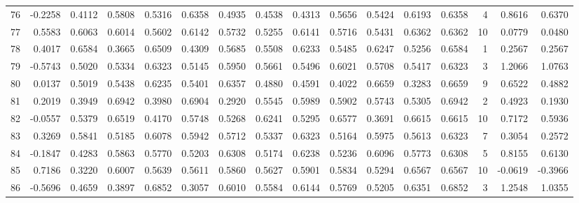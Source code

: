 \begin{tabular}{lrrrrrrrrrrrrrrr}
76  &     -0.2258 &  0.4112 &  0.5808 &  0.5316 &  0.6358 &  0.4935 &  0.4538 &  0.4313 &  0.5656 &  0.5424 &   0.6193 &     0.6358 &      4 &                    0.8616 &                     0.6370 \\
77  &      0.5583 &  0.6063 &  0.6014 &  0.5602 &  0.6142 &  0.5732 &  0.5255 &  0.6141 &  0.5716 &  0.5431 &   0.6362 &     0.6362 &     10 &                    0.0779 &                     0.0480 \\
78  &      0.4017 &  0.6584 &  0.3665 &  0.6509 &  0.4309 &  0.5685 &  0.5508 &  0.6233 &  0.5485 &  0.6247 &   0.5256 &     0.6584 &      1 &                    0.2567 &                     0.2567 \\
79  &     -0.5743 &  0.5020 &  0.5334 &  0.6323 &  0.5145 &  0.5950 &  0.5661 &  0.5496 &  0.6021 &  0.5708 &   0.5417 &     0.6323 &      3 &                    1.2066 &                     1.0763 \\
80  &      0.0137 &  0.5019 &  0.5438 &  0.6235 &  0.5401 &  0.6357 &  0.4880 &  0.4591 &  0.4022 &  0.6659 &   0.3283 &     0.6659 &      9 &                    0.6522 &                     0.4882 \\
81  &      0.2019 &  0.3949 &  0.6942 &  0.3980 &  0.6904 &  0.2920 &  0.5545 &  0.5989 &  0.5902 &  0.5743 &   0.5305 &     0.6942 &      2 &                    0.4923 &                     0.1930 \\
82  &     -0.0557 &  0.5379 &  0.6519 &  0.4170 &  0.5748 &  0.5268 &  0.6241 &  0.5295 &  0.6577 &  0.3691 &   0.6615 &     0.6615 &     10 &                    0.7172 &                     0.5936 \\
83  &      0.3269 &  0.5841 &  0.5185 &  0.6078 &  0.5942 &  0.5712 &  0.5337 &  0.6323 &  0.5164 &  0.5975 &   0.5613 &     0.6323 &      7 &                    0.3054 &                     0.2572 \\
84  &     -0.1847 &  0.4283 &  0.5863 &  0.5770 &  0.5203 &  0.6308 &  0.5174 &  0.6238 &  0.5236 &  0.6096 &   0.5773 &     0.6308 &      5 &                    0.8155 &                     0.6130 \\
85  &      0.7186 &  0.3220 &  0.6007 &  0.5639 &  0.5611 &  0.5860 &  0.5627 &  0.5901 &  0.5834 &  0.5294 &   0.6567 &     0.6567 &     10 &                   -0.0619 &                    -0.3966 \\
86  &     -0.5696 &  0.4659 &  0.3897 &  0.6852 &  0.3057 &  0.6010 &  0.5584 &  0.6144 &  0.5769 &  0.5205 &   0.6351 &     0.6852 &      3 &                    1.2548 &                     1.0355 \\

\end{tabular}
